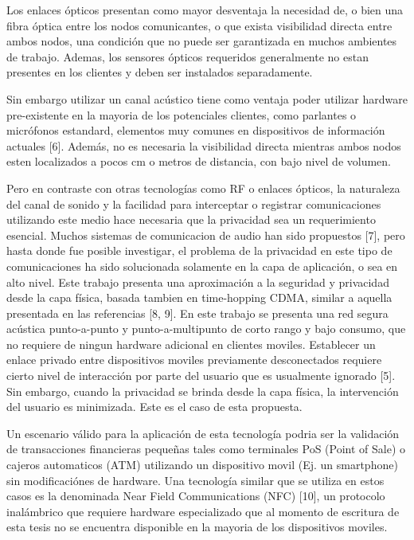 Los enlaces ópticos presentan como mayor desventaja la necesidad de, o bien una fibra óptica entre los nodos comunicantes, o que exista visibilidad directa entre ambos nodos, una condición que no puede ser garantizada en muchos ambientes de trabajo. Ademas, los sensores ópticos requeridos generalmente no estan presentes en los clientes y deben ser instalados separadamente.

Sin embargo utilizar un canal acústico tiene como ventaja poder utilizar hardware pre-existente en la mayoria de los potenciales clientes, como parlantes o micrófonos estandard, elementos muy comunes en dispositivos de información actuales [6]. Además, no es necesaria la visibilidad directa mientras ambos nodos esten localizados a pocos cm o metros de distancia, con bajo nivel de volumen.

Pero en contraste con otras tecnologías como RF o enlaces ópticos, la naturaleza del canal de sonido y la facilidad para interceptar o registrar comunicaciones utilizando este medio hace necesaria que la privacidad sea un requerimiento esencial. Muchos sistemas de comunicacion de audio han sido propuestos [7], pero hasta donde fue posible investigar, el problema de la privacidad en este tipo de comunicaciones ha sido solucionada solamente en la capa de aplicación, o sea en alto nivel. Este trabajo presenta una aproximación a la seguridad y privacidad desde la capa física, basada tambien en time-hopping CDMA, similar a aquella presentada en las referencias [8, 9]. En este trabajo se presenta una red segura acústica punto-a-punto y punto-a-multipunto de corto rango y bajo consumo, que no requiere de ningun hardware adicional en clientes moviles.
Establecer un enlace privado entre dispositivos moviles previamente desconectados requiere cierto nivel de interacción por parte del usuario que es usualmente ignorado [5]. Sin embargo, cuando la privacidad se brinda desde la capa física, la intervención del usuario es minimizada. Este es el caso de esta propuesta.

Un escenario válido para la aplicación de esta tecnología podria ser la validación de transacciones financieras pequeñas tales como terminales PoS (Point of Sale) o cajeros automaticos (ATM) utilizando un dispositivo movil (Ej. un smartphone) sin modificaciónes de hardware. Una tecnología similar que se utiliza en estos casos es la denominada Near Field Communications (NFC) [10], un protocolo inalámbrico que requiere hardware especializado que al momento de escritura de esta tesis no se encuentra disponible en la mayoria de los dispositivos moviles.

